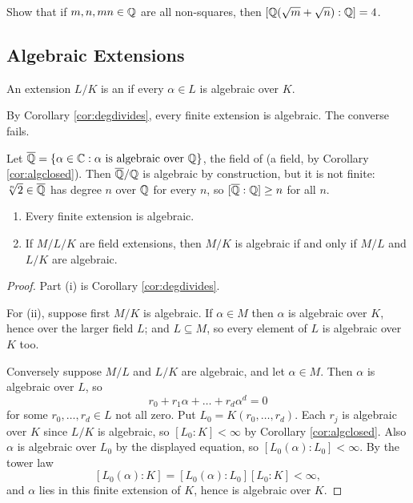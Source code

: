\documentclass[a4paper]{scrartcl}
\begin{document}
\begin{exercise}
	Show that if $m, n, mn \in \mathbb{Q}$ are all non-squares, then $[\mathbb{Q}(\sqrt m + \sqrt n):\mathbb{Q}] = 4$.
\end{exercise}

\subsection{Algebraic Extensions}

\begin{definition}
	An extension $L/K$ is an  if every $\alpha \in L$ is algebraic over $K$.
\end{definition}

By Corollary \ref{cor:degdivides}, every finite extension is algebraic. The converse fails.

\begin{example}
	Let $\overline{\mathbb{Q}} = \{\alpha \in \mathbb{C} : \alpha \text{ is algebraic over } \mathbb{Q}\}$, the field of  (a field, by Corollary \ref{cor:algclosed}). Then $\overline{\mathbb{Q}}/\mathbb{Q}$ is algebraic by construction, but it is not finite: $\sqrt[n]{2} \in \overline{\mathbb{Q}}$ has degree $n$ over $\mathbb{Q}$ for every $n$, so $[\overline{\mathbb{Q}} : \mathbb{Q}] \geq n$ for all $n$.
\end{example}

\begin{proposition}\label{prop:algebraictower}
	\begin{enumerate}[label=(\roman*)]
		\item Every finite extension is algebraic.
		\item If $M/L/K$ are field extensions, then $M/K$ is algebraic if and only if $M/L$ and $L/K$ are algebraic.
	\end{enumerate}
\end{proposition}

\begin{proof}
	Part (i) is Corollary \ref{cor:degdivides}.

	For (ii), suppose first $M/K$ is algebraic. If $\alpha \in M$ then $\alpha$ is algebraic over $K$, hence over the larger field $L$; and $L \subseteq M$, so every element of $L$ is algebraic over $K$ too.

	Conversely suppose $M/L$ and $L/K$ are algebraic, and let $\alpha \in M$. Then $\alpha$ is algebraic over $L$, so
	$$r_0 + r_1\alpha + \dots + r_d\alpha^d = 0$$
	for some $r_0, \dots, r_d \in L$ not all zero. Put $L_0 = K(r_0, \dots, r_d)$. Each $r_j$ is algebraic over $K$ since $L/K$ is algebraic, so $[L_0 : K] < \infty$ by Corollary \ref{cor:algclosed}. Also $\alpha$ is algebraic over $L_0$ by the displayed equation, so $[L_0(\alpha):L_0] < \infty$. By the tower law
	$$[L_0(\alpha) : K] = [L_0(\alpha):L_0][L_0:K] < \infty,$$
	and $\alpha$ lies in this finite extension of $K$, hence is algebraic over $K$.
\end{proof}
\end{document}
